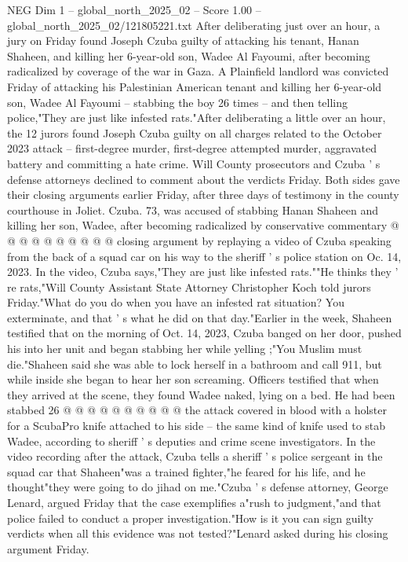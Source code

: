 \begin{textsample}{NEG Dim 1 – global\_north\_2025\_02 – Score 1.00 – global\_north\_2025\_02/121805221.txt}  \label{ex:f1_neg_016}
After deliberating just over an hour, a jury on Friday found Joseph Czuba guilty of attacking his tenant, Hanan Shaheen, and killing her 6-year-old son, Wadee Al Fayoumi, after becoming radicalized by coverage of the war in Gaza.
A Plainfield landlord was convicted Friday of attacking his Palestinian American tenant and killing her 6-year-old son, Wadee Al Fayoumi -- stabbing the boy 26 times -- and then telling police,"They are just like infested rats."After deliberating a little over an hour, the 12 jurors found Joseph Czuba guilty on all charges related to the October 2023 attack -- first-degree murder, first-degree attempted murder, aggravated battery and committing a hate crime.
Will County prosecutors and Czuba ' s defense attorneys declined to comment about the verdicts Friday.
Both sides gave their closing arguments earlier Friday, after three days of testimony in the county courthouse in Joliet.
Czuba. 73, was accused of stabbing Hanan Shaheen and killing her son, Wadee, after becoming radicalized by conservative commentary @ @ @ @ @ @ @ @ @ @ closing argument by replaying a video of Czuba speaking from the back of a squad car on his way to the sheriff ' s police station on Oc. 14, 2023.
In the video, Czuba says,"They are just like infested rats.""He thinks they ' re rats,"Will County Assistant State Attorney Christopher Koch told jurors Friday."What do you do when you have an infested rat situation?
You exterminate, and that ' s what he did on that day."Earlier in the week, Shaheen testified that on the morning of Oct. 14, 2023, Czuba banged on her door, pushed his into her unit and began stabbing her while yelling ;"You Muslim must die."Shaheen said she was able to lock herself in a bathroom and call 911, but while inside she began to hear her son screaming.
Officers testified that when they arrived at the scene, they found Wadee naked, lying on a bed.
He had been stabbed 26 @ @ @ @ @ @ @ @ @ @ the attack covered in blood with a holster for a ScubaPro knife attached to his side -- the same kind of knife used to stab Wadee, according to sheriff ' s deputies and crime scene investigators.
In the video recording after the attack, Czuba tells a sheriff ' s police sergeant in the squad car that Shaheen"was a trained fighter,"he feared for his life, and he thought"they were going to do jihad on me."Czuba ' s defense attorney, George Lenard, argued Friday that the case exemplifies a"rush to judgment,"and that police failed to conduct a proper investigation."How is it you can sign guilty verdicts when all this evidence was not tested?"Lenard asked during his closing argument Friday.

\end{textsample}

